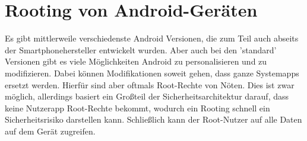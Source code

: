 \section{Rooting von Android-Geräten}

	Es gibt mittlerweile verschiedenste Android Versionen, die zum Teil auch abseits der Smartphonehersteller entwickelt wurden. Aber auch bei den 'standard' Versionen gibt es viele Möglichkeiten Android zu personalisieren und zu modifizieren. Dabei können Modifikationen soweit gehen, dass ganze Systemapps ersetzt werden. Hierfür sind aber oftmals Root-Rechte von Nöten. Dies ist zwar möglich, allerdings basiert ein Großteil der Sicherheitsarchitektur darauf, dass keine Nutzerapp Root-Rechte bekommt, wodurch ein Rooting schnell ein Sicherheitsrisiko darstellen kann. Schließlich kann der Root-Nutzer auf alle Daten auf dem Gerät zugreifen.